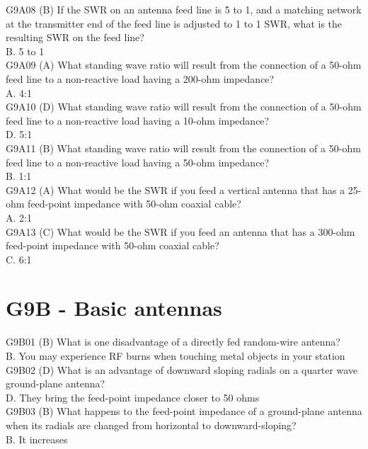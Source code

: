 \documentclass[12pt,letterpaper]{report}
\begin{document}
G9A08 (B) If the SWR on an antenna feed line is 5 to 1, and a matching network at the transmitter end of the feed line is adjusted to 1 to 1 SWR, what is the resulting SWR on the feed line?\\
B. 5 to 1\\

G9A09 (A) What standing wave ratio will result from the connection of a 50-ohm feed line to a non-reactive load having a 200-ohm impedance?\\
A. 4:1\\

G9A10 (D) What standing wave ratio will result from the connection of a 50-ohm feed line to a non-reactive load having a 10-ohm impedance?\\
D. 5:1\\

G9A11 (B) What standing wave ratio will result from the connection of a 50-ohm feed line to a non-reactive load having a 50-ohm impedance?\\
B. 1:1\\

G9A12 (A) What would be the SWR if you feed a vertical antenna that has a 25-ohm feed-point impedance with 50-ohm coaxial cable?\\
A. 2:1\\

G9A13 (C) What would be the SWR if you feed an antenna that has a 300-ohm feed-point impedance with 50-ohm coaxial cable?\\
C. 6:1\\

\section{G9B - Basic antennas}


G9B01 (B) What is one disadvantage of a directly fed random-wire antenna?\\
B. You may experience RF burns when touching metal objects in your station \\

G9B02 (D) What is an advantage of downward sloping radials on a quarter wave ground-plane antenna?\\
D. They bring the feed-point impedance closer to 50 ohms\\

G9B03 (B) What happens to the feed-point impedance of a ground-plane antenna when its radials are changed from horizontal to downward-sloping?\\
B. It increases\\
\end{document}
